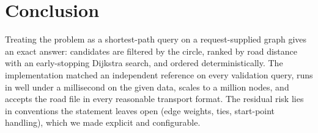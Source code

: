 \documentclass[11pt,a4paper]{article}
\begin{document}
\section{Conclusion}
Treating the problem as a shortest-path query on a request-supplied graph gives an exact answer: candidates are filtered by the
circle, ranked by road distance with an early-stopping Dijkstra search, and ordered deterministically. The implementation matched an
independent reference on every validation query, runs in well under a millisecond on the given data, scales to a million nodes, and
accepts the road file in every reasonable transport format. The residual risk lies in conventions the statement leaves open (edge
weights, ties, start-point handling), which we made explicit and configurable.
\end{document}
